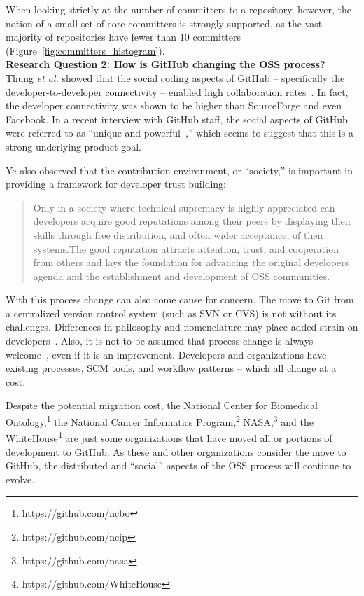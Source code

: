 \documentclass{proc}
\begin{document}
{{{{{When looking strictly at the number of committers to a repository, however, the notion of a small set of core committers is strongly supported, as the vast majority of repositories have fewer than 10 committers (Figure~\ref{fig:committers_histogram}).\\

\noindent \textbf{Research Question 2: How is GitHub changing the OSS process?}\\
Thung \textit{et al.} showed that the social coding aspects of GitHub -- specifically the developer-to-developer connectivity -- enabled high collaboration rates~\cite{thung2013network}. In fact, the developer connectivity was shown to be higher than SourceForge and even Facebook. In a recent interview with GitHub staff, the social aspects of GitHub were referred to as ``unique and powerful~\cite{begel2013social},'' which seems to suggest that this is a strong underlying product goal.

Ye also observed that the contribution environment, or ``society,'' is important in providing a framework for developer trust building:
\begin{quote}
Only in a society where technical supremacy is highly appreciated can developers acquire good reputations among their peers by displaying their skills through free distribution, and often wider acceptance, of their systems.The good reputation attracts attention, trust, and cooperation from others and lays the foundation for advancing the original developers agenda and the establishment and development of OSS communities.~\cite{ye2003toward}
\end{quote}

With this process change can also come cause for concern. The move to Git from a centralized version control system (such as SVN or CVS) is not without its challenges. Differences in philosophy and nomenclature may place added strain on developers~\cite{bird2009promises}. Also, it is not to be assumed that process change is always welcome~\cite{de2009software}, even if it is an improvement. Developers and organizations have existing processes, SCM tools, and workflow patterns -- which all change at a cost.

Despite the potential migration cost, the National Center for Biomedical Ontology,\footnote{https://github.com/ncbo} the National Cancer Informatics Program,\footnote{https://github.com/ncip} NASA,\footnote{https://github.com/nasa} and the WhiteHouse\footnote{https://github.com/WhiteHouse} are just some organizations that have moved all or portions of development to GitHub. As these and other organizations consider the move to GitHub, the distributed and ``social'' aspects of the OSS process will continue to evolve.

}}}}}
\end{document}
